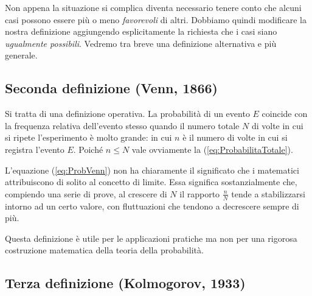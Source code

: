 \noindent Non appena la situazione si complica diventa necessario tenere
conto che alcuni casi possono essere pi\`u o meno {\itshape favorevoli}
di altri. Dobbiamo quindi modificare la nostra definizione aggiungendo
esplicitamente la richiesta che i casi siano \emph{ugualmente possibili}.
Vedremo tra breve una definizione alternativa e pi\`u generale.


\begin{exemplify}


\end{exemplify}


\subsection{Seconda definizione (Venn, 1866)}

Si tratta di una definizione operativa. La probabilit\`a di un evento
$E$ coincide con la frequenza relativa dell'evento stesso quando
il numero totale $N$ di volte in cui si ripete l'esperimento \`e molto grande:
in cui $n$ \`e il numero di volte in cui si registra l'evento $E$.
Poich\'e $n\le N$ vale ovviamente la (\ref{eq:ProbabilitaTotale}).

L'equazione (\ref{eq:ProbVenn}) non ha chiaramente il significato
che i matematici attribuiscono di solito al concetto di limite.
Essa significa sostanzialmente che, compiendo una serie di prove,
al crescere di $N$ il rapporto $\frac{n}{N}$ tende a stabilizzarsi intorno
ad un certo valore, con fluttuazioni che tendono a decrescere sempre di pi\`u.

Questa definizione \`e utile per le applicazioni pratiche ma non per una
rigorosa costruzione matematica della teoria della probabilit\`a.


\subsection{Terza definizione (Kolmogorov, 1933)}

